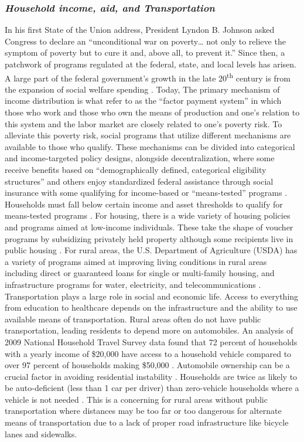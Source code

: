 \subsubsection{\textit{Household income, aid, and Transportation}}
In his first State of the Union address, President Lyndon B. Johnson asked Congress to declare an “unconditional war on poverty… not only to relieve the symptom of poverty but to cure it and, above all, to prevent it.” %
Since then, a patchwork of programs regulated at the federal, state, and local levels has arisen. A large part of the federal government's growth in the late 20\textsuperscript{th} century is from the expansion of social welfare spending \citep{fishback_social_2020}. Today, The primary mechanism of income distribution is what \citet{berkowitz_gaps_2023} refer to as the “factor payment system” in which those who work and those who own the means of production and one’s relation to this system and the labor market are closely related to one’s poverty risk. To alleviate this poverty risk, social programs that utilize different mechanisms are available to those who qualify. These mechanisms can be divided into categorical and income-targeted policy designs, alongside decentralization, where some receive benefits based on “demographically defined, categorical eligibility structures” and others enjoy standardized federal assistance through social insurance with some qualifying for income-based or “means-tested” programs \citep{bruch_poverty_2023}. Households must fall below certain income and asset thresholds to qualify for means-tested programs \citep{rank_welfare_2002}. For housing, there is a wide variety of housing policies and programs aimed at low-income individuals. These take the shape of voucher programs by subsidizing privately held property although some recipients live in public housing \citep{kim_housing_2017}. For rural areas, the U.S. Department of Agriculture (USDA) has a variety of programs aimed at improving living conditions in rural areas including direct or guaranteed loans for single or multi-family housing, and infrastructure programs for water, electricity, and telecommunications \citep{noauthor_usda_2023}. Transportation plays a large role in social and economic life. Access to everything from education to healthcare depends on the infrastructure and the ability to use available means of transportation. Rural areas often do not have public transportation, leading residents to depend more on automobiles. An analysis of 2009 National Household Travel Survey data found that 72 percent of households with a yearly income of \$20,000 have access to a household vehicle compared to over 97 percent of households making \$50,000 \citep{blumenberg_automobile_2012}. Automobile ownership can be a crucial factor in avoiding residential instability \citep{kang_why_2019}. Households are twice as likely to be auto-deficient (less than 1 car per driver) than zero-vehicle households where a vehicle is not needed \citep{blumenberg_car-deficit_2020}. This is a concerning for rural areas without public transportation where distances may be too far or too dangerous for alternate means of transportation due to a lack of proper road infrastructure like bicycle lanes and sidewalks.
 
